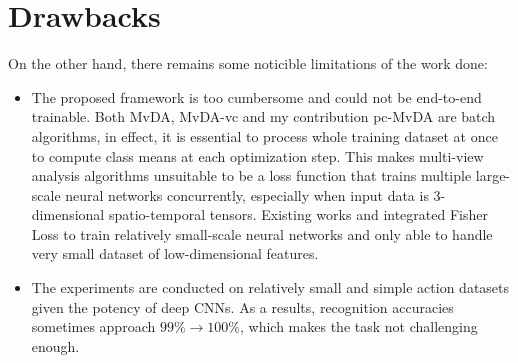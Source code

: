 
\section{Drawbacks} \label{sec:drawbacks}

    On the other hand, there remains some noticible limitations of the work done:
    \begin{itemize}
        \item The proposed framework is too cumbersome and could not be end-to-end trainable.
        Both MvDA, MvDA-vc and my contribution pc-MvDA are batch algorithms, in effect, it is essential to process whole training dataset at once to compute class means at each optimization step.
        This makes multi-view analysis algorithms unsuitable to be a loss function that trains multiple large-scale neural networks concurrently, especially when input data is 3-dimensional spatio-temporal tensors.
        Existing works \cite{kan2016multi} and \cite{cao2017generalized} integrated Fisher Loss to train relatively small-scale neural networks and only able to handle very small dataset of low-dimensional features.
        \item The experiments are conducted on relatively small and simple action datasets given the potency of deep CNNs.
        As a results, recognition accuracies sometimes approach $99\%\to100\%$, which makes the task not challenging enough.
    \end{itemize}
